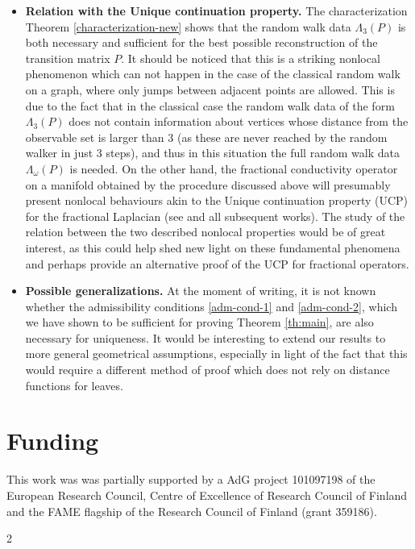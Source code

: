 \documentclass[a4paper,11pt,oneside]{amsart}
\begin{document}
\begin{itemize}
    \item \textbf{Relation with the Unique continuation property.} The characterization Theorem \ref{characterization-new} shows that the random walk data $\Lambda_3(P)$ is both necessary and sufficient for the best possible reconstruction of the transition matrix $P$. It should be noticed that this is a striking nonlocal phenomenon which can not happen in the case of the classical random walk on a graph, where only jumps between adjacent points are allowed. This is due to the fact that in the classical case the random walk data of the form $\Lambda_3(P)$ does not contain information about vertices whose distance from the observable set is larger than $3$ (as these are never reached by the random walker in just $3$ steps), and thus in this situation the full random walk data $\Lambda_\omega(P)$ is needed. On the other hand, the fractional conductivity operator on a manifold obtained by the procedure discussed above will presumably present nonlocal behaviours akin to the Unique continuation property (UCP) for the fractional Laplacian (see \cite{GSU20} and all subsequent works). The study of the relation between the two described nonlocal properties would be of great interest, as this could help shed new light on these fundamental phenomena and perhaps provide an alternative proof of the UCP for fractional operators. \\
    \item \textbf{Possible generalizations.} At the moment of writing, it is not known whether the admissibility conditions \ref{adm-cond-1} and \ref{adm-cond-2}, which we have shown to be sufficient for proving Theorem \ref{th:main}, are also necessary for uniqueness. It would be interesting to extend our results to more general geometrical assumptions, especially in light of the fact that this would require a different method of proof which does not rely on distance functions for leaves.
\end{itemize}

\section{Funding}
This work was was partially supported by a AdG project 101097198 of the European Research Council, Centre of Excellence of Research Council of Finland and the FAME flagship of the Research Council of Finland (grant 359186).


\begin{spacing}{2}  %
    
\end{spacing}


\end{document}
